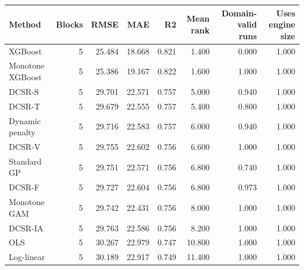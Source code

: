 \begin{tabular}{lrrrrrrr}
\toprule
Method & Blocks & RMSE & MAE & R2 & Mean rank & Domain-valid runs & Uses engine size \\
\midrule
XGBoost & 5 & 25.484 & 18.668 & 0.821 & 1.400 & 0.000 & 1.000 \\
Monotone XGBoost & 5 & 25.386 & 19.167 & 0.822 & 1.600 & 1.000 & 1.000 \\
DCSR-S & 5 & 29.701 & 22.571 & 0.757 & 5.000 & 0.940 & 1.000 \\
DCSR-T & 5 & 29.679 & 22.555 & 0.757 & 5.400 & 0.800 & 1.000 \\
Dynamic penalty & 5 & 29.716 & 22.583 & 0.757 & 6.000 & 0.940 & 1.000 \\
DCSR-V & 5 & 29.755 & 22.602 & 0.756 & 6.600 & 1.000 & 1.000 \\
Standard GP & 5 & 29.751 & 22.571 & 0.756 & 6.800 & 0.740 & 1.000 \\
DCSR-F & 5 & 29.727 & 22.604 & 0.756 & 6.800 & 0.973 & 1.000 \\
Monotone GAM & 5 & 29.742 & 22.431 & 0.756 & 8.000 & 1.000 & 1.000 \\
DCSR-IA & 5 & 29.763 & 22.586 & 0.756 & 8.200 & 1.000 & 1.000 \\
OLS & 5 & 30.267 & 22.979 & 0.747 & 10.800 & 1.000 & 1.000 \\
Log-linear & 5 & 30.189 & 22.917 & 0.749 & 11.400 & 1.000 & 1.000 \\
\bottomrule
\end{tabular}
